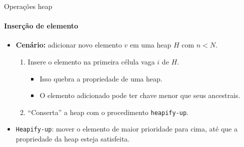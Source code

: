 \begin{frame}{Operações heap}
\framesubtitle{Inserção de elemento}

\begin{itemize}
	\item \textbf{Cenário:} adicionar novo elemento $v$ em uma heap $H$ com $n < N$.
	\begin{enumerate}
		\item Insere o elemento na primeira célula vaga $i$ de $H$.
		\begin{itemize}
			\item Isso quebra a propriedade de uma heap.
			\item O elemento adicionado pode ter chave menor que seus ancestrais.
		\end{itemize}
		\item ``Conserta'' a heap com o procedimento \texttt{heapify-up}.
	\end{enumerate}

	\bigskip

	\item \texttt{Heapify-up}: mover o elemento de maior prioridade para cima, até que a propriedade da heap esteja satisfeita.
\end{itemize}
\end{frame}



